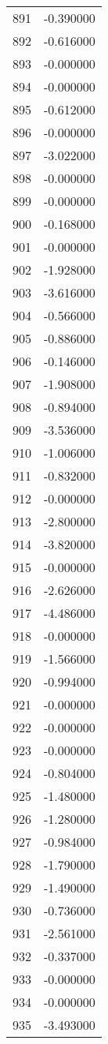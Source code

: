 \documentclass[12pt]{article}
\begin{document}
\begin{longtable}{@{}cc@{}}
891 & -0.390000 \\
892 & -0.616000 \\
893 & -0.000000 \\
894 & -0.000000 \\
895 & -0.612000 \\
896 & -0.000000 \\
897 & -3.022000 \\
898 & -0.000000 \\
899 & -0.000000 \\
900 & -0.168000 \\
901 & -0.000000 \\
902 & -1.928000 \\
903 & -3.616000 \\
904 & -0.566000 \\
905 & -0.886000 \\
906 & -0.146000 \\
907 & -1.908000 \\
908 & -0.894000 \\
909 & -3.536000 \\
910 & -1.006000 \\
911 & -0.832000 \\
912 & -0.000000 \\
913 & -2.800000 \\
914 & -3.820000 \\
915 & -0.000000 \\
916 & -2.626000 \\
917 & -4.486000 \\
918 & -0.000000 \\
919 & -1.566000 \\
920 & -0.994000 \\
921 & -0.000000 \\
922 & -0.000000 \\
923 & -0.000000 \\
924 & -0.804000 \\
925 & -1.480000 \\
926 & -1.280000 \\
927 & -0.984000 \\
928 & -1.790000 \\
929 & -1.490000 \\
930 & -0.736000 \\
931 & -2.561000 \\
932 & -0.337000 \\
933 & -0.000000 \\
934 & -0.000000 \\
935 & -3.493000 \\

\end{longtable}
\end{document}

